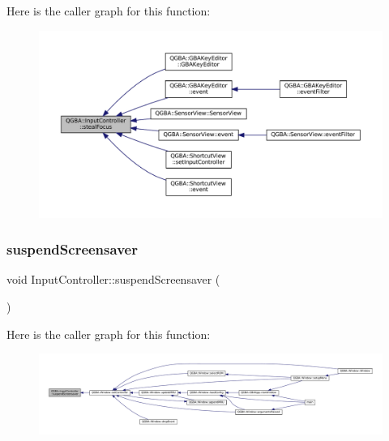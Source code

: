 Here is the caller graph for this function\+:
\nopagebreak
\begin{figure}[H]
\begin{center}
\leavevmode
\includegraphics[width=350pt]{class_q_g_b_a_1_1_input_controller_a353b5eb540cb42cca70e50adb41db9f1_icgraph}
\end{center}
\end{figure}
\mbox{\label{class_q_g_b_a_1_1_input_controller_a4386bdf93be039e66f99b3f92d248971}} 
\subsubsection{\texorpdfstring{suspend\+Screensaver}{suspendScreensaver}}
{\footnotesize\ttfamily void Input\+Controller\+::suspend\+Screensaver (\begin{DoxyParamCaption}{ }\end{DoxyParamCaption})\hspace{0.3cm}{\ttfamily [slot]}}

Here is the caller graph for this function\+:
\nopagebreak
\begin{figure}[H]
\begin{center}
\leavevmode
\includegraphics[width=350pt]{class_q_g_b_a_1_1_input_controller_a4386bdf93be039e66f99b3f92d248971_icgraph}
\end{center}
\end{figure}
\mbox{\label{class_q_g_b_a_1_1_input_controller_ab1edf8a6d6f63d6ad03359668019a573}} 
